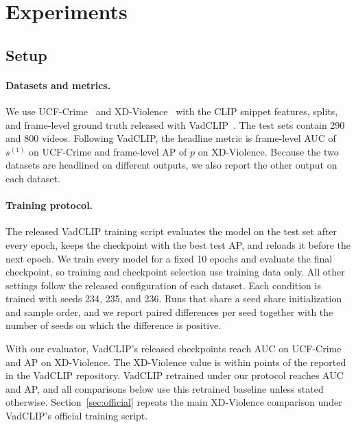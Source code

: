 
\section{Experiments}
\label{sec:experiments}

\subsection{Setup}
\label{sec:setup}

\paragraph{Datasets and metrics.}
We use UCF-Crime~\cite{sultani2018real} and XD-Violence~\cite{wu2020xdviolence} with the CLIP snippet features, splits, and frame-level ground truth released with VadCLIP~\cite{wu2024vadclip}. The test sets contain 290 and 800 videos. Following VadCLIP, the headline metric is frame-level AUC of $s^{(1)}$ on UCF-Crime and frame-level AP of $p$ on XD-Violence. Because the two datasets are headlined on different outputs, we also report the other output on each dataset.

\paragraph{Training protocol.}
The released VadCLIP training script evaluates the model on the test set after every epoch, keeps the checkpoint with the best test AP, and reloads it before the next epoch. We train every model for a fixed 10 epochs and evaluate the final checkpoint, so training and checkpoint selection use training data only. All other settings follow the released configuration of each dataset. Each condition is trained with seeds 234, 235, and 236. Runs that share a seed share initialization and sample order, and we report paired differences per seed together with the number of seeds on which the difference is positive.

With our evaluator, VadCLIP's released checkpoints reach \ucfOfficial{} AUC on UCF-Crime and \xdOfficial{} AP on XD-Violence. The XD-Violence value is within \xdReadmeGap{} points of the \xdReadmeAp{} reported in the VadCLIP repository. VadCLIP retrained under our protocol reaches \ucfRetrained{} AUC and \xdBase{} AP, and all comparisons below use this retrained baseline unless stated otherwise. Section~\ref{sec:official} repeats the main XD-Violence comparison under VadCLIP's official training script.


